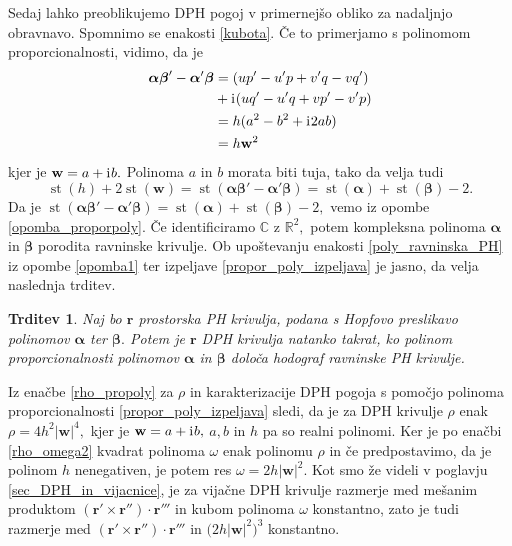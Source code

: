 \documentclass[12pt,a4paper,twoside]{article}
\newcommand{\iu}{\mathrm{i}\mkern1mu} %
\theoremstyle{definition} %
\theoremstyle{plain} %
\newtheorem{trditev}[definicija]{Trditev}
\theoremstyle{primerstyle}
\numberwithin{equation}{section}  %
\newcommand{\R}{\mathbb R}
\renewcommand{\C}{\mathbb C}
\newcommand{\rV}{\mathbf{r}}
\newcommand{\wV}{\mathbf{w}}
\newcommand{\balpha}{\boldsymbol \alpha}
\newcommand{\bbeta}{\boldsymbol \beta}
\DeclareMathOperator{\st}{st}
\begin{document}
Sedaj lahko preoblikujemo DPH pogoj v primernejšo obliko za nadaljnjo obravnavo. Spomnimo se enakosti \eqref{kubota}. Če to primerjamo s polinomom proporcionalnosti, vidimo, da je
\begin{align}
	\balpha\bbeta'-\balpha'\bbeta&=(up'-u'p+v'q-vq')\nonumber \\
	&+\iu(uq'-u'q+vp'-v'p) \label{propor_poly_izpeljava} \\
	&=h(a^2-b^2+\iu 2ab) \nonumber \\
	&=h\wV^2 \nonumber
\end{align}
kjer je $\wV=a+\iu b.$ Polinoma $a$ in $b$ morata biti tuja, tako da velja tudi
\begin{equation}
	\st(h)+2\st(\wV)=\st(\balpha\bbeta'-\balpha'\bbeta)=\st(\balpha)+\st(\bbeta)-2.
	\end{equation}
Da je $\st(\balpha\bbeta'-\balpha'\bbeta)=\st(\balpha)+\st(\bbeta)-2,$ vemo iz opombe \ref{opomba_proporpoly}. Če identificiramo $\C$ z $\R^2,$ potem kompleksna polinoma $\balpha$ in $\bbeta$ porodita ravninske krivulje. Ob upoštevanju enakosti \eqref{poly_ravninska_PH} iz opombe \ref{opomba1} ter izpeljave \eqref{propor_poly_izpeljava} je jasno, da velja naslednja trditev.
\begin{trditev}
	Naj bo $\rV$ prostorska PH krivulja, podana s Hopfovo preslikavo polinomov $\balpha$ ter $\bbeta.$ Potem je $\rV$ DPH krivulja natanko takrat, ko polinom proporcionalnosti polinomov $\balpha$ in $\bbeta$ določa hodograf ravninske PH krivulje.
\end{trditev}

Iz enačbe \eqref{rho_propoly} za $\rho$ in karakterizacije DPH pogoja s pomočjo polinoma proporcionalnosti \eqref{propor_poly_izpeljava} sledi, da je za DPH krivulje $\rho$ enak $\rho=4h^2|\wV|^4,$ kjer je $\wV=a+\iu b,$ $a,b$ in $h$ pa so realni polinomi. Ker je po enačbi \eqref{rho_omega2} kvadrat polinoma $\omega$ enak polinomu $\rho$ in če predpostavimo, da je polinom $h$ nenegativen, je potem res $\omega=2h|\wV|^2.$ Kot smo že videli v poglavju \ref{sec_DPH_in_vijacnice}, je za vijačne DPH krivulje razmerje med mešanim produktom $(\rV'\times\rV'')\cdot\rV'''$ in kubom polinoma $\omega$ konstantno, zato je tudi razmerje med $(\rV'\times\rV'')\cdot\rV'''$ in $\big(2h|\wV|^2\big)^3$ konstantno.
\end{document}
